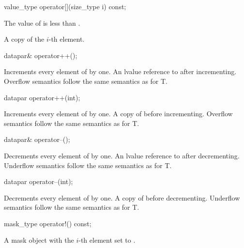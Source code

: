 \begin{itemdecl}
value_type operator[](size_type i) const;
\end{itemdecl}
\begin{itemdescr}
  \pnum\requires The value of  is less than .

  \pnum\returns A copy of the $i$-th element.
\end{itemdescr}

\begin{itemdecl}
datapar& operator++();
\end{itemdecl}
\begin{itemdescr}
  \pnum\effects Increments every element of  by one.
  \pnum\returns An lvalue reference to  after incrementing.
  \pnum\remarks Overflow semantics follow the same semantics as for \type T.
\end{itemdescr}

\begin{itemdecl}
datapar operator++(int);
\end{itemdecl}
\begin{itemdescr}
  \pnum\effects Increments every element of  by one.
  \pnum\returns A copy of  before incrementing.
  \pnum\remarks Overflow semantics follow the same semantics as for \type T.
\end{itemdescr}

\begin{itemdecl}
datapar& operator--();
\end{itemdecl}
\begin{itemdescr}
  \pnum\effects Decrements every element of  by one.
  \pnum\returns An lvalue reference to  after decrementing.
  \pnum\remarks Underflow semantics follow the same semantics as for \type T.
\end{itemdescr}

\begin{itemdecl}
datapar operator--(int);
\end{itemdecl}
\begin{itemdescr}
  \pnum\effects Decrements every element of  by one.
  \pnum\returns A copy of  before decrementing.
  \pnum\remarks Underflow semantics follow the same semantics as for \type T.
\end{itemdescr}

\begin{itemdecl}
mask_type operator!() const;
\end{itemdecl}
\begin{itemdescr}
  \pnum\returns A mask object with the $i$-th element set to  \foralli.
\end{itemdescr}

